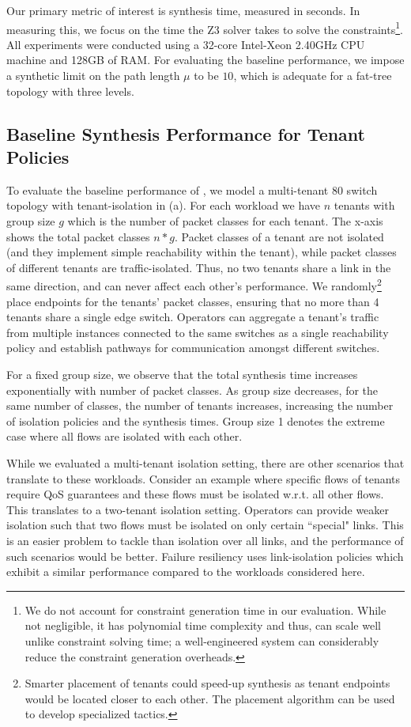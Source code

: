 Our primary metric of interest is synthesis time, measured in
seconds. In measuring this, we focus on the time the Z3 solver takes
to solve the constraints\footnote{
	We do not account for
constraint generation time in our evaluation. While not negligible, 
it has polynomial time complexity and thus, can scale well unlike
constraint solving time;
a well-engineered system can considerably reduce
the constraint generation overheads.}. 
All experiments were conducted using a
32-core Intel-Xeon 2.40GHz CPU machine and
128GB of RAM. For evaluating the baseline performance, we impose a
synthetic limit on the path length $\mu$ to be $10$, which is adequate 
for a fat-tree topology with three levels. 

\subsection{Baseline Synthesis Performance for Tenant Policies} \label{sec:baselineeval} 
 To evaluate the baseline
performance of \Name, we model a multi-tenant 80 switch
 topology with tenant-isolation in
(a).  For each workload we have $n$ tenants with
group size $g$ which is the number of packet classes for each
tenant. The x-axis shows the total packet classes $n*g$.  Packet
classes of a tenant are not isolated (and they implement simple
reachability within the tenant), while packet classes of different
tenants are traffic-isolated. Thus, no two tenants share a link in
the same direction, and can never
affect each other's performance.  We randomly\footnote{ Smarter
  placement of tenants could speed-up synthesis as tenant endpoints
  would be located closer to each other. The placement algorithm can
  be used to develop specialized tactics.}  place endpoints for the
tenants' packet classes, ensuring that no more than 4 tenants share a
single edge switch.  Operators can aggregate a tenant's traffic from
multiple instances connected to the same switches 
as a single reachability policy and establish
pathways for communication amongst different switches.

For a fixed group size, we observe that the total synthesis time
increases exponentially with number of packet classes.  As
 group size decreases, for the same number of classes, the 
number of tenants increases, increasing the number of isolation policies
and the synthesis times. 
Group size 1 denotes the
extreme case where all flows are isolated with each other.
 
While we evaluated a multi-tenant isolation setting, there are other
scenarios that translate to these workloads. Consider an example where
specific flows of tenants require QoS guarantees and these flows must
be isolated w.r.t. all other flows. This translates to a two-tenant
isolation setting. Operators can provide weaker isolation such that
two flows must be isolated on only certain ``special" links. 
This is an easier problem to tackle than isolation over all
links, and the performance of such scenarios would be better. 
Failure resiliency uses link-isolation policies which exhibit a similar
performance compared to the workloads considered here. 

